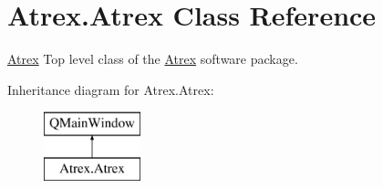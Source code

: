 \hypertarget{classAtrex_1_1Atrex}{\section{Atrex.\-Atrex Class Reference}
\label{classAtrex_1_1Atrex}
}


\hyperlink{classAtrex_1_1Atrex}{Atrex} Top level class of the \hyperlink{classAtrex_1_1Atrex}{Atrex} software package.  


Inheritance diagram for Atrex.\-Atrex\-:\begin{figure}[H]
\begin{center}
\leavevmode
\includegraphics[height=2.000000cm]{classAtrex_1_1Atrex}
\end{center}
\end{figure}
